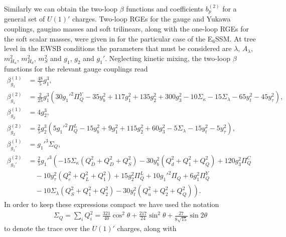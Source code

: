 \documentclass[preprint,amsmath,amssymb,aps,superscriptaddress,prd,showpacs,floatfix,nofootinbib]{revtex4-1}
\begin{document}
Similarly we can obtain the two-loop $\beta$ functions and
coefficients $b_p^{(2)}$ for a general set of $U(1)'$
charges. Two-loop RGEs for the gauge and Yukawa couplings, gaugino
masses and soft trilinears, along with the one-loop RGEs for the soft
scalar masses, were given in \cite{Athron:2009bs} for the particular
case of the E$_6$SSM. At tree level in the EWSB conditions the
parameters that must be considered are $\lambda$, $A_\lambda$,
$m_{H_u}^2$, $m_{H_d}^2$, $m_S^2$ and $g_1$, $g_2$ and $g_1'$. Neglecting kinetic
mixing, the two-loop $\beta$ functions for the relevant gauge couplings read
\begin{subequations}\label{eq:USSMGaugeBetas}
\begin{align}
\beta_{g_1}^{(1)}&=\frac{48}{5}g_1^3,\label{eq:USSMg1BetaOneLoop}\\
\beta_{g_1}^{(2)}&=\frac{2}{25} g_1^3 \left(30 g_1'^2 \Pi_{Q}^Y-35 y_b^2+117 g_1^2+135 g_2^2+300 g_3^2-10 \Sigma _{\kappa }-15
   \Sigma _{\lambda }-65 y_t^2-45 y_{\tau }^2\right),\label{eq:USSMg1BetaTwoLoop}\\
\beta_{g_2}^{(1)}&=4g_2^3,\label{eq:USSMg2BetaOneLoop}\\
\beta_{g_2}^{(2)}&=\frac{2}{5} g_2^3 \left(5 g_1'^2 \Pi _{Q}^L-15 y_b^2+9 g_1^2+115 g_2^2+60 g_3^2-5 \Sigma _{\lambda }-15
   y_t^2-5 y_{\tau }^2\right),\label{eq:USSMg2BetaTwoLoop}\\
\beta_{g_1'}^{(1)}&=g_1'^3\Sigma_{Q},\label{eq:USSMg1pBetaOneLoop}\\
\beta_{g_1'}^{(2)}&=\frac{2}{5} g_1'^3 \left(-15 \Sigma _{\kappa } \left(Q_{\bar{D}}^2+Q_D^2+Q_S^2\right)-30
   y_b^2 \left(Q_d^2+Q_1^2+Q_Q^2\right)+120 g_3^2 \Pi _{Q}^C\right.\nonumber \\
&\quad{}-10 y_{\tau }^2
   \left(Q_e^2+Q_L^2+Q_1^2\right)+15 g_2^2 \Pi _{Q}^L+10 g_1'^2 \Pi _{Q}+6
   g_1^2 \Pi _{Q}^Y\nonumber\\
&\quad\left.{}-10 \Sigma _{\lambda } \left(Q_S^2+Q_1^2+Q_2^2\right)-30 y_t^2
   \left(Q_u^2+Q_2^2+Q_Q^2\right)\right).\label{eq:USSMg1pBetaTwoLoop}
\end{align}
\end{subequations}
In order to keep these expressions compact we have used the notation
\begin{align*}
\Sigma_{Q}=\sum_i Q_i^2=\frac{321}{40}\cos^2\theta+\frac{217}{24}\sin^2\theta+\frac{27}{8\sqrt{15}}\sin 2\theta
\end{align*}
to denote the trace over the $U(1)'$ charges, along with
\end{document}
